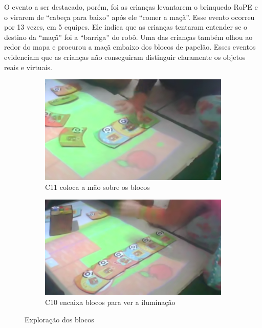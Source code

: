O evento a ser destacado, porém, foi as crianças levantarem o brinquedo RoPE e o virarem de “cabeça para baixo” após ele “comer a maçã”. Esse evento ocorreu por 13 vezes, em 5 equipes. Ele indica que as crianças tentaram entender se o destino da “maçã” foi a “barriga” do robô. Uma das crianças também olhou ao redor do mapa e procurou a maçã embaixo dos blocos de papelão. Esses eventos evidenciam que as crianças não conseguiram distinguir claramente os objetos reais e virtuais. 

\begin{figure}[!htbp]
    \centering
    \begin{subfigure}{.5\textwidth}
        \centering
        \includegraphics[width=.9\linewidth,fbox]{figs/percepcao_ra/mao_sobre_blocos.png}
        \caption{C11 coloca a mão sobre os blocos}
        \label{fig:mao_sobre_blocos}
    \end{subfigure}%
    \begin{subfigure}{.5\textwidth}
        \centering
        \includegraphics[width=.9\linewidth,fbox]{figs/percepcao_ra/sequencia_blocos.png}
        \caption{C10 encaixa blocos para ver a iluminação}
        \label{fig:sequencia_blocos}
    \end{subfigure}
    \caption{Exploração dos blocos}
    \label{fig:percepcoes_ra}
\end{figure}

